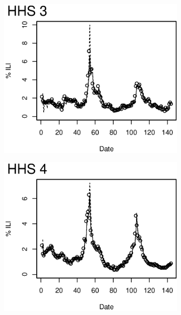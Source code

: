 \begin{figure}
\begin{subfigure}[b]{0.49\textwidth}
\end{subfigure}
\\
\begin{subfigure}[b]{0.49\textwidth}
	\includegraphics[width=\textwidth]{longitude/figs/nowcastHHS_3.eps}
\end{subfigure}
\begin{subfigure}[b]{0.49\textwidth}
	\includegraphics[width=\textwidth]{longitude/figs/nowcastHHS_4.eps}
\end{subfigure}

\end{figure}
